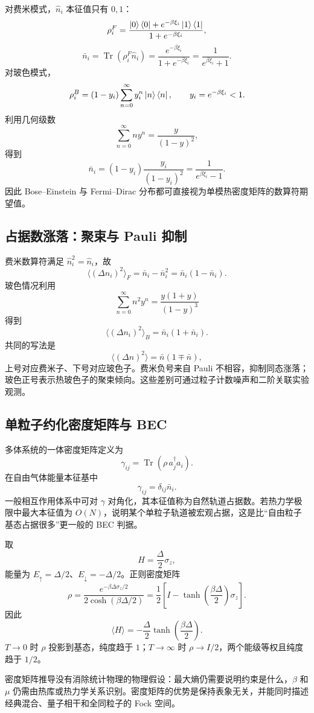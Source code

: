 对费米模式，$\hat n_i$ 本征值只有 $0,1$：
\[
\rho_i^F
=\frac{\left|0\right\rangle\left\langle0\right|+e^{-\beta\xi_i}\left|1\right\rangle\left\langle1\right|}
{1+e^{-\beta\xi_i}},
\]
\[
\bar n_i=\operatorname{Tr}(\rho_i^F\hat n_i)
=\frac{e^{-\beta\xi_i}}{1+e^{-\beta\xi_i}}
=\frac1{e^{\beta\xi_i}+1}.
\]
对玻色模式，
\[
\rho_i^B=(1-y_i)\sum_{n=0}^\infty y_i^n\left|n\right\rangle\left\langle n\right|,
\qquad y_i=e^{-\beta\xi_i}<1.
\]
利用几何级数
\[
\sum_{n=0}^\infty ny^n=\frac{y}{(1-y)^2},
\]
得到
\[
\bar n_i=(1-y_i)\frac{y_i}{(1-y_i)^2}
=\frac1{e^{\beta\xi_i}-1}.
\]
因此 Bose--Einstein 与 Fermi--Dirac 分布都可直接视为单模热密度矩阵的数算符期望值。

\subsection{占据数涨落：聚束与 Pauli 抑制}
费米数算符满足 $\hat n_i^2=\hat n_i$，故
\[
\langle(\Delta n_i)^2\rangle_F
=\bar n_i-\bar n_i^2
=\boxed{\bar n_i(1-\bar n_i)}.
\]
玻色情况利用
\[
\sum_{n=0}^\infty n^2y^n
=\frac{y(1+y)}{(1-y)^3}
\]
得到
\[
\langle(\Delta n_i)^2\rangle_B
=\boxed{\bar n_i(1+\bar n_i)}.
\]
共同的写法是
\[
\langle(\Delta n)^2\rangle
=\bar n(1\mp\bar n),
\]
上号对应费米子、下号对应玻色子。费米负号来自 Pauli 不相容，抑制同态涨落；玻色正号表示热玻色子的聚束倾向。这些差别可通过粒子计数噪声和二阶关联实验观测。

\subsection{单粒子约化密度矩阵与 BEC}
多体系统的一体密度矩阵定义为
\[
\gamma_{ij}=\operatorname{Tr}
(\rho\,a_j^\dagger a_i).
\]
在自由气体能量本征基中
\[
\gamma_{ij}=\delta_{ij}\bar n_i.
\]
一般相互作用体系中可对 $\gamma$ 对角化，其本征值称为自然轨道占据数。若热力学极限中最大本征值为 $O(N)$，说明某个单粒子轨道被宏观占据，这是比“自由粒子基态占据很多”更一般的 BEC 判据。

\begin{examplebox}[title=两能级系统的热密度矩阵]
取
\[
H=\frac{\Delta}{2}\sigma_z,
\]
能量为 $E_\uparrow=\Delta/2$、$E_\downarrow=-\Delta/2$。正则密度矩阵
\[
\rho=\frac{e^{-\beta\Delta\sigma_z/2}}
{2\cosh(\beta\Delta/2)}
=\frac12\left[
I-\tanh\left(\frac{\beta\Delta}{2}\right)\sigma_z
\right].
\]
因此
\[
\langle H\rangle
=-\frac{\Delta}{2}\tanh\left(\frac{\beta\Delta}{2}\right).
\]
$T\to0$ 时 $\rho$ 投影到基态，纯度趋于 $1$；$T\to\infty$ 时
$\rho\to I/2$，两个能级等权且纯度趋于 $1/2$。
\end{examplebox}

\begin{pitfallbox}
密度矩阵推导没有消除统计物理的物理假设：最大熵仍需要说明约束是什么，$\beta$ 和 $\mu$ 仍需由热库或热力学关系识别。密度矩阵的优势是保持表象无关，并能同时描述经典混合、量子相干和全同粒子的 Fock 空间。
\end{pitfallbox}

